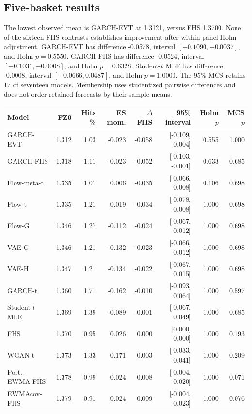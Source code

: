\documentclass[11pt]{article}
\theoremstyle{definition}\newtheorem{definition}[theorem]{Definition}
\theoremstyle{remark}\newtheorem{remark}[theorem]{Remark}
\begin{document}
\subsection{Five-basket results}
The lowest observed mean is GARCH-EVT at 1.3121, versus FHS 1.3700. None of the sixteen FHS contrasts establishes improvement after within-panel Holm adjustment. GARCH-EVT has difference -0.0578, interval $[-0.1090,-0.0037]$, and Holm $p=0.5550$. GARCH-FHS has difference -0.0524, interval $[-0.1031,-0.0008]$, and Holm $p=0.6328$. Student-$t$ MLE has difference -0.0008, interval $[-0.0666,0.0487]$, and Holm $p=1.0000$. The 95\% MCS retains 17 of seventeen models. Membership uses studentized pairwise differences and does not order retained forecasts by their sample means.
\begin{table}[htbp]
\centering\footnotesize
\setlength{\tabcolsep}{4pt}
\begin{tabular}{lrrrrrrr}
\toprule
Model & FZ0 & Hits \% & ES mom. & $\Delta$ FHS & 95\% interval & Holm $p$ & MCS $p$ \\
\midrule
GARCH-EVT & 1.312 & 1.03 & -0.023 & -0.058 & [-0.109, -0.004] & 0.555 & 1.000 \\
GARCH-FHS & 1.318 & 1.11 & -0.023 & -0.052 & [-0.103, -0.001] & 0.633 & 0.685 \\
Flow-meta-t & 1.335 & 1.01 & 0.006 & -0.035 & [-0.066, -0.008] & 0.106 & 0.698 \\
Flow-t & 1.335 & 1.21 & 0.019 & -0.034 & [-0.078, 0.008] & 1.000 & 0.698 \\
Flow-G & 1.346 & 1.27 & -0.112 & -0.024 & [-0.067, 0.012] & 1.000 & 0.698 \\
VAE-G & 1.346 & 1.21 & -0.132 & -0.023 & [-0.066, 0.012] & 1.000 & 0.698 \\
VAE-H & 1.347 & 1.21 & -0.134 & -0.022 & [-0.067, 0.015] & 1.000 & 0.698 \\
GARCH-t & 1.360 & 1.71 & -0.162 & -0.010 & [-0.093, 0.064] & 1.000 & 0.597 \\
Student-$t$ MLE & 1.369 & 1.39 & -0.089 & -0.001 & [-0.067, 0.049] & 1.000 & 0.685 \\
FHS & 1.370 & 0.95 & 0.026 & 0.000 & [0.000, 0.000] & 1.000 & 0.193 \\
WGAN-t & 1.373 & 1.33 & 0.171 & 0.003 & [-0.033, 0.041] & 1.000 & 0.209 \\
Port.-EWMA-FHS & 1.378 & 0.99 & 0.024 & 0.008 & [-0.004, 0.020] & 1.000 & 0.071 \\
EWMAcov-FHS & 1.379 & 0.91 & 0.024 & 0.009 & [-0.004, 0.023] & 1.000 & 0.076 \\

\end{tabular}
\end{table}
\end{document}
